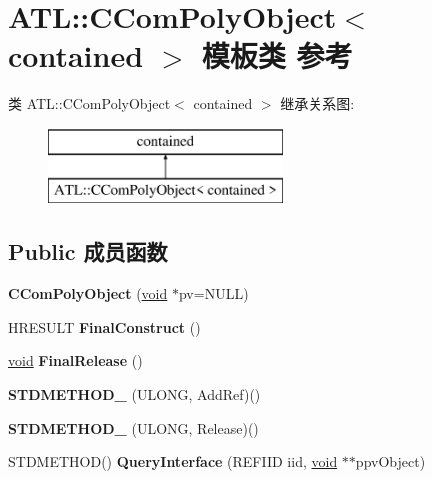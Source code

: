 \hypertarget{class_a_t_l_1_1_c_com_poly_object}{}\section{A\+TL\+:\+:C\+Com\+Poly\+Object$<$ contained $>$ 模板类 参考}
\label{class_a_t_l_1_1_c_com_poly_object}
类 A\+TL\+:\+:C\+Com\+Poly\+Object$<$ contained $>$ 继承关系图\+:\begin{figure}[H]
\begin{center}
\leavevmode
\includegraphics[height=2.000000cm]{class_a_t_l_1_1_c_com_poly_object}
\end{center}
\end{figure}
\subsection*{Public 成员函数}
\begin{DoxyCompactItemize}
\item 
\mbox{\label{class_a_t_l_1_1_c_com_poly_object_a3543e601a983d84b86943454708ae104}} 
{\bfseries C\+Com\+Poly\+Object} (\hyperlink{interfacevoid}{void} $\ast$pv=N\+U\+LL)
\item 
\mbox{\label{class_a_t_l_1_1_c_com_poly_object_a5c404db627b3e9c27e5f63961b8dcb95}} 
H\+R\+E\+S\+U\+LT {\bfseries Final\+Construct} ()
\item 
\mbox{\label{class_a_t_l_1_1_c_com_poly_object_a55729be36057e023b485013a993faa1e}} 
\hyperlink{interfacevoid}{void} {\bfseries Final\+Release} ()
\item 
\mbox{\label{class_a_t_l_1_1_c_com_poly_object_a30ec92036e48a57a77592f1186df4d5a}} 
{\bfseries S\+T\+D\+M\+E\+T\+H\+O\+D\+\_\+} (U\+L\+O\+NG, Add\+Ref)()
\item 
\mbox{\label{class_a_t_l_1_1_c_com_poly_object_ab63f68d0901d414a33d797ce2e132094}} 
{\bfseries S\+T\+D\+M\+E\+T\+H\+O\+D\+\_\+} (U\+L\+O\+NG, Release)()
\item 
\mbox{\label{class_a_t_l_1_1_c_com_poly_object_ab52321f3bb54d9275fd9f2670502f495}} 
S\+T\+D\+M\+E\+T\+H\+OD() {\bfseries Query\+Interface} (R\+E\+F\+I\+ID iid, \hyperlink{interfacevoid}{void} $\ast$$\ast$ppv\+Object)
\end{DoxyCompactItemize}
